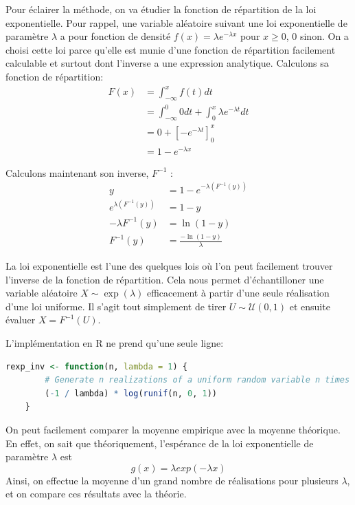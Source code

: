 \documentclass[10pt]{article} %
\begin{document}
Pour éclairer la méthode, on va étudier la fonction de répartition de la loi exponentielle. Pour rappel, une variable aléatoire suivant une loi exponentielle de paramètre
$\lambda$ a pour fonction de densité $f(x) = \lambda e^{-\lambda x}$ pour $x \geq 0$, $0$ sinon. On a choisi cette loi parce qu'elle est munie d'une fonction de répartition facilement calculable
et surtout dont l'inverse a une expression analytique. Calculons sa fonction de répartition:
\begin{align*}
    F(x) &= \int_{-\infty}^xf(t)dt \\
    & = \int_{-\infty}^0 0 dt + \int_0^x \lambda e^{-\lambda t} dt \\
    &= 0 + \left[-e^{-\lambda t}\right]_0^x \\
    &= 1 - e^{-\lambda x}
\end{align*}

Calculons maintenant son inverse, $F^{-1}$ :
\begin{align*}
    y &= 1 - e^{-\lambda (F^{-1}(y))} \\
    e^{\lambda (F^{-1}(y))} &= 1 - y \\
    -\lambda F^{-1}(y) &= \ln(1 - y) \\
    F^{-1}(y) &= \frac{-\ln(1 - y)}{\lambda}
\end{align*}

La loi exponentielle est l'une des quelques lois où l'on peut facilement trouver l'inverse de la fonction de répartition. Cela nous permet
d'échantilloner une variable aléatoire $X \sim \exp(\lambda)$ efficacement à partir d'une seule réalisation d'une loi uniforme. Il s'agit tout
simplement de tirer $U \sim \mathcal{U}(0, 1)$ et ensuite évaluer $X = F^{-1}(U)$.

L'implémentation en R ne prend qu'une seule ligne:

\begin{lstlisting}[language=R]
    rexp_inv <- function(n, lambda = 1) {
        # Generate n realizations of a uniform random variable n times
        (-1 / lambda) * log(runif(n, 0, 1))
    }
\end{lstlisting}

On peut facilement comparer la moyenne empirique avec la moyenne théorique. En effet, on sait que théoriquement, l'espérance de la loi exponentielle de paramètre $\lambda$ est $$g(x)=\lambda exp(-\lambda x)$$ Ainsi, on effectue la moyenne d'un grand nombre de réalisations pour plusieurs $\lambda$,  et on compare ces résultats avec la théorie.
\end{document}
